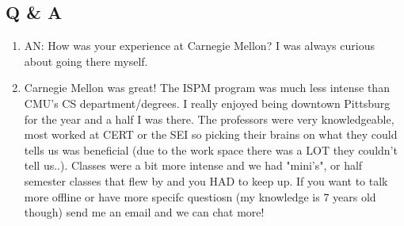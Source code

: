 \subsection{Q \& A}
    \begin{enumerate}
        \item AN: How was your experience at Carnegie Mellon? I was always curious about going there myself.

        \item Carnegie Mellon was great! The ISPM program was much less intense than CMU's CS department/degrees. I really enjoyed being downtown Pittsburg for the year and a half I was there. The professors were very knowledgeable, most worked at CERT or the SEI so picking their brains on what they could tells us was beneficial (due to the work space there was a LOT they couldn't tell us..). Classes were a bit more intense and we had "mini's", or half semester classes that flew by and you HAD to keep up. If you want to talk more offline or have more specifc questiosn (my knowledge is 7 years old though) send me an email and we can chat more!
    
    \end{enumerate}
